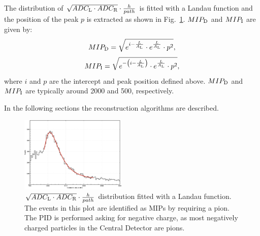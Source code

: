The distribution of $\sqrt{ADC_{\rm{L}}\cdot ADC_{\rm{R}}}\cdot \frac{h}{path} $ is fitted with a Landau function and the position of the peak $p$ is extracted as shown in Fig.~\ref{energy}.
$MIP_{\rm{D}}$ and $MIP_{\rm{I}}$ are given by:
\begin{equation}
MIP_{\rm{D}}=\sqrt{e^{i-\frac{L}{A_{\rm{L}}}}\cdot e^{\frac{L}{A_{\rm{L}}}}\cdot p^2},
\end{equation}
\begin{equation}
MIP_{\rm{I}}=\sqrt{e^{-\left(i-\frac{L}{A_{\rm{L}}}\right)}\cdot e^{\frac{L}{A_{\rm{L}}}}\cdot p^2},
\end{equation}
where $i$ and $p$ are the intercept and peak position defined above.
$MIP_{\rm{D}}$ and $MIP_{\rm{I}}$ are typically around 2000 and 500, respectively.

In the following sections the reconstruction algorithms are described.
\begin{figure}
\begin{center}
\includegraphics[width=0.45\textwidth]{Figure/energy.png} 
\caption{$\sqrt{ADC_{\rm{L}}\cdot ADC_{\rm{R}}}\cdot \frac{h}{path} $ distribution fitted with a Landau function. The events in this plot are identified as MIPs by requiring a pion. The PID is performed asking for negative charge, as most negatively charged particles in the Central Detector are pions.}
\label{energy}
\end{center}
\end{figure}
